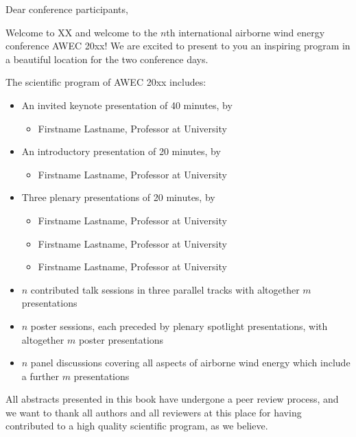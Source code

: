 \begin{multicols}{2}
Dear conference participants,

Welcome to XX and welcome to the $n$th international airborne wind energy conference AWEC 20xx! We are excited to present to you an inspiring program in a beautiful location for the two conference days.

The scientific program of AWEC 20xx includes:

\begin{itemize}
\item An invited keynote presentation of 40 minutes, by

\begin{itemize}
\item  Firstname Lastname, Professor at University
\end{itemize}

\item An introductory presentation of 20 minutes, by

\begin{itemize}
\item Firstname Lastname, Professor at University
\end{itemize}

\item Three plenary presentations of 20 minutes, by

\begin{itemize}
\item Firstname Lastname, Professor at University

\item Firstname Lastname, Professor at University

\item  Firstname Lastname, Professor at University
\end{itemize}

\item $n$ contributed talk sessions in three parallel tracks with altogether $m$ presentations

\item $n$ poster sessions, each preceded by plenary spotlight presentations, with altogether $m$ poster presentations

\item $n$ panel discussions covering all aspects of airborne wind energy which include a further $m$ presentations

\end{itemize}

All abstracts presented in this book have undergone a peer review process, and we want to thank all authors and all reviewers at this place for having contributed to a high quality scientific program, as we believe.


\end{multicols}
